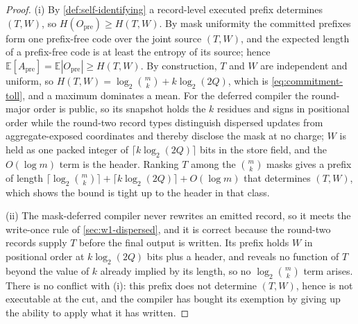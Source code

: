 \documentclass[aps,prx,reprint,superscriptaddress,floatfix,longbibliography]{revtex4-2}
\begin{document}
\begin{proof}
(i) By \cref{def:self-identifying} a record-level executed prefix
determines $(T,W)$, so $H(O_{\mathrm{pre}})\geq H(T,W)$.  By mask
uniformity the committed prefixes form one prefix-free code over the
joint source $(T,W)$, and the expected length of a prefix-free code is at
least the entropy of its source; hence
$\mathbb E[A_{\mathrm{pre}}]=\mathbb E|O_{\mathrm{pre}}|\geq H(T,W)$.
By construction, $T$ and $W$ are independent and uniform, so
$H(T,W)=\log_2\binom{m}{k}+k\log_2(2Q)$, which is
\eqref{eq:commitment-toll}, and a maximum dominates a mean.  For the
deferred compiler the round-major order is public, so its snapshot holds
the $k$ residues and signs in positional order while the round-two record
types distinguish dispersed updates from aggregate-exposed coordinates
and thereby disclose the mask at no charge;
$W$ is held as one packed integer of $\lceil k\log_2(2Q)\rceil$ bits in
the store field, and the $O(\log m)$ term is the header.
Ranking $T$ among the $\binom mk$ masks gives a prefix of length
$\lceil\log_2\binom mk\rceil+\lceil k\log_2(2Q)\rceil+O(\log m)$ that
determines $(T,W)$, which shows the bound is tight up to the header in that
class.

(ii) The mask-deferred compiler never rewrites an emitted record, so it
meets the write-once rule of \cref{sec:w1-dispersed}, and it is correct because the round-two
records supply $T$ before the final output is written.  Its prefix
holds $W$ in positional order at $k\log_2(2Q)$ bits plus a header, and
reveals no function of $T$ beyond the value of $k$ already implied by
its length, so no $\log_2\binom{m}{k}$ term arises.  There is no
conflict with (i): this prefix does not determine $(T,W)$, hence is not
executable at the cut, and the compiler has bought its exemption by
giving up the ability to apply what it has written.
\end{proof}
\end{document}
